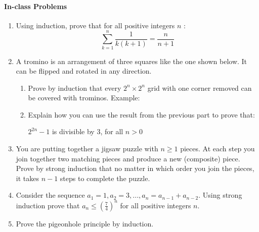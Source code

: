 \documentclass[12pt]{article}
\begin{document}
\paragraph*{In-class Problems}
\begin{enumerate}

\item Using induction, prove that for all positive integers $n$ :
$$
\sum_{k=1}^{n}\frac{1}{k(k+1)}=\frac{n}{n+1}
$$

\item A tromino is an arrangement of three squares like the one shown below. It can be flipped and rotated in any direction. 

\begin{center}


\end{center}


\begin{enumerate}
\item
 Prove by induction that every $2^n \times 2^n$ grid with one corner removed can be covered with trominos. Example:

\begin{center}


\end{center}

\item Explain how you can use the result from the previous part to prove that: 
\begin{center}
$2^{2n}-1$ is divisible by $3$, for all $n>0$
\end{center}

\end{enumerate}



\item You are putting together a jigsaw puzzle with $n \geq 1$ pieces. At each step you join together two matching pieces and produce a new (composite) piece. Prove by strong induction that no matter in which order you join the pieces, it takes $n-1$ steps to complete the puzzle. 

\item Consider the sequence $ a_1=1, a_2=3, ..., a_n=a_{n-1}+a_{n-2} $. Using strong induction prove that $ a_n\le \left( \frac{7}{4} \right) ^n $ for all positive integers $n$.


\item Prove the pigeonhole principle by induction. 

\end{enumerate}
\pagebreak
\end{document}

